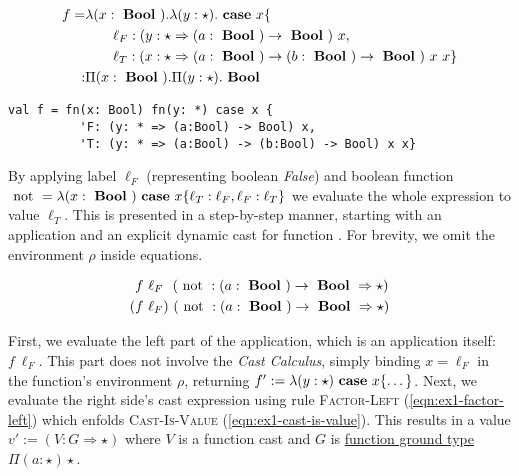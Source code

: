 \begin{equation}\label{eqn:ccldlc-example1}
\begin{split}
f = & \lambda (x: \text{ \textbf{Bool} })
. \lambda (y: \star )
. \text{ \textbf{case} } x \{ \\
& \qquad \ell_F: (y : \star \Rightarrow (a:\text{ \textbf{Bool} }) \rightarrow \text{ \textbf{Bool} })~x, \\
& \qquad \ell_T: (x : \star \Rightarrow (a:\text{ \textbf{Bool} }) \rightarrow (b:\text{ \textbf{Bool} }) \rightarrow \text{ \textbf{Bool} })~x~x \} \\
: & \Pi(x : \text{ \textbf{Bool} }) . \Pi (y: \star ) . \text{ \textbf{Bool} }
\end{split}
\end{equation}

\begin{lstlisting}[language=ldgv,
  label=lst:ccldgv-example1,
  caption=CCLDGV example ``dependent function cast'']
val f = fn(x: Bool) fn(y: *) case x {
          'F: (y: * => (a:Bool) -> Bool) x,
          'T: (y: * => (a:Bool) -> (b:Bool) -> Bool) x x}
\end{lstlisting}

By applying label $\ell_F$ (representing boolean \emph{False}) and boolean function $\text{ not } = \lambda (x:\text{ \textbf{Bool} }) \text{ \textbf{case} } x \{ \ell_T: \ell_F, \ell_F: \ell_T\}$ we evaluate the whole expression to value $\ell_T$. This is presented in a step-by-step manner, starting with an application and an explicit dynamic cast for function \notf. For brevity, we omit the environment $\rho$ inside equations.

\begin{align}
& f~\ell_F~~(\text{ not } : (a:\text{ \textbf{Bool} }) \rightarrow \text{ \textbf{Bool} } \Rightarrow \star) \\
( & f~\ell_F)~(\text{ not } : (a:\text{ \textbf{Bool} }) \rightarrow \text{ \textbf{Bool} } \Rightarrow \star)
\end{align}

First, we evaluate the left part of the application, which is an application itself: $f~\ell_F$. This part does not involve the \emph{Cast Calculus}, simply binding $x=\ell_F$ in the function's environment $\rho$, returning $f' := \lambda (y:\star) \text{ \textbf{case} } x \{ \dots \}$. Next, we evaluate the right side's cast expression using rule \textsc{Factor-Left} (\ref{eqn:ex1-factor-left}) which enfolds \textsc{Cast-Is-Value} (\ref{eqn:ex1-cast-is-value}). This results in a value $v' := (V : G \Rightarrow \star)$ where $V$ is a function cast and $G$ is \underline{function ground type} $\Pi(a:\star)\star$.

